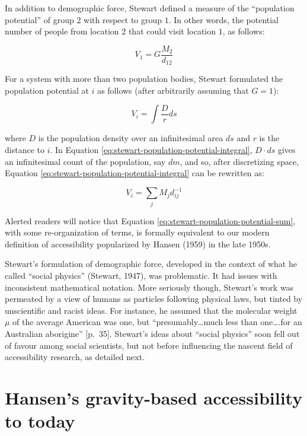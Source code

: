 \documentclass[
11pt, %
oneside, %
english, %
singlespacing, %
]{macthesis} %
\begin{document}
In addition to demographic force, Stewart defined a measure of the ``population potential'' of group \(2\) with respect to group \(1\). In other words, the potential number of people from location \(2\) that could visit location \(1\), as follows:

\begin{equation}
\label{eq:stewart-population-potential}
V_1 = G\frac{M_2}{d_{12}}
\end{equation} 

For a system with more than two population bodies, Stewart formulated the population potential at \(i\) as follows (after arbitrarily assuming that \(G=1\)):

\begin{equation}
\label{eq:stewart-population-potential-integral}
V_i = \int\frac{D}{r} ds
\end{equation} 

\noindent where \(D\) is the population density over an infinitesimal area \(ds\) and \(r\) is the distance to \(i\). In Equation \ref{eq:stewart-population-potential-integral}, \(D\cdot ds\) gives an infinitesimal count of the population, say \(dm\), and so, after discretizing space, Equation \ref{eq:stewart-population-potential-integral} can be rewritten as:

\begin{equation}
\label{eq:stewart-population-potential-sum}
V_i = \sum_j M_jd_{ij}^{-1}
\end{equation} 

Alerted readers will notice that Equation \ref{eq:stewart-population-potential-sum}, with some re-organization of terms, is formally equivalent to our modern definition of accessibility popularized by Hansen (1959) in the late 1950s.

Stewart's formulation of demographic force, developed in the context of what he called ``social physics'' (Stewart, 1947), was problematic. It had issues with inconsistent mathematical notation. More seriously though, Stewart's work was permeated by a view of humans as particles following physical laws, but tinted by unscientific and racist ideas. For instance, he assumed that the molecular weight \(\mu\) of the average American was one, but ``presumably\ldots much less than one\ldots.for an Australian aborigine'' {[}p.~35{]}. Stewart's ideas about ``social physics'' soon fell out of favour among social scientists, but not before influencing the nascent field of accessibility research, as detailed next.

\section{Hansen's gravity-based accessibility to today}\label{grav-to-today}
\end{document}
